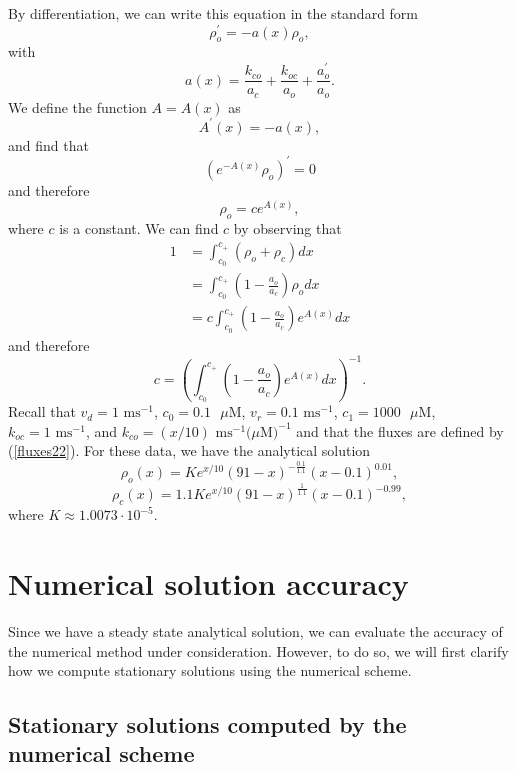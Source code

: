 By differentiation, we can write this equation in the standard form%
\begin{equation}
\rho_{o}^{\prime}=-a(x)\rho_{o},%
\end{equation}
with%
\[
a(x)=\frac{k_{co}}{a_{c}}+\frac{k_{oc}}{a_{o}}+\frac{a_{o}^{\prime}}{a_{o}%
}.
\]
We define the function $A=A(x)$ as%
\[
A^{\prime}(x)=-a(x),
\]
and find that
\[
\left(  e^{-A(x)}\rho_{o}\right)  ^{\prime}=0
\]
and therefore%
\[
\rho_{o}=ce^{A(x)},%
\]
where $c$ is a constant. We can find $c$ by observing that%
\begin{align*}
1 &  =\int_{c_{0}}^{c_{+}}\left(  \rho_{o}+\rho_{c}\right)  dx\\
&  =\int_{c_{0}}^{c_{+}}\left(  1-\frac{a_{o}}{a_{c}}\right)  \rho_{o}dx\\
&  =c\int_{c_{0}}^{c_{+}}\left(  1-\frac{a_{o}}{a_{c}}\right)  e^{A(x)}dx
\end{align*}
and therefore%
\begin{equation}
c=\left(  \int_{c_{0}}^{c_{+}}\left(  1-\frac{a_{o}}{a_{c}}\right) 
e^{A(x)}dx\right)  ^{-1}.\label{c}%
\end{equation}
Recall that $v_{d}=1\text{ ms}^{-1}$, $c_{0}=0.1\text{ }\mu \mathrm{{ M}}$,
$v_{r}=0.1\text{ ms}^{-1}$, $c_{1}=1000\text{ }\mu \mathrm{{ M}}$, $k_{oc}%
=1\text{ ms}^{-1}$, and $k_{co}=(x/10)\text{ ms}^{-1} (\mu \mathrm{ M)^{-1}}$
 and that the fluxes are defined by (\ref{fluxes22}). 
For these data, we have the analytical solution
\[ \rho_o(x) = K e^{x/10} (91-x)^{-\frac{0.1}{1.1}} (x-0.1)^{0.01}, \]
\[ \rho_c(x)  = 1.1 K e^{x/10} (91-x)^{\frac{1}{1.1}} (x-0.1)^{-0.99}, \]
where $K \approx1.0073\cdot 10^{-5}$.

\section{Numerical solution accuracy \label{accuracy}}

Since we have a steady state analytical solution, we can 
evaluate the accuracy of the numerical method under consideration.
However, to do so, we will first clarify how we compute stationary 
solutions using the numerical scheme.

\subsection{Stationary solutions computed by the numerical scheme}
 
